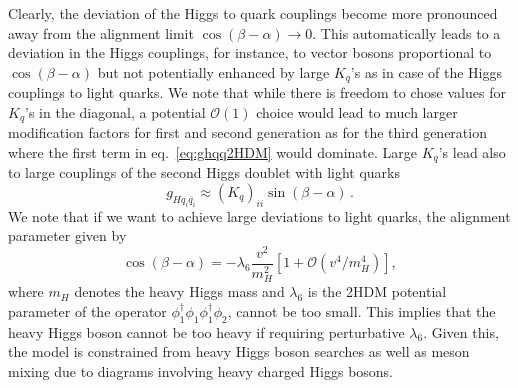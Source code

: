 Clearly, the deviation of the Higgs to quark couplings become more pronounced away from the alignment limit $\cos(\beta-\alpha)\to 0$. This automatically leads to a deviation in the Higgs couplings, for instance, to vector bosons proportional to $\cos(\beta-\alpha) $ but not potentially enhanced by large $K_{q}$'s as in case of the Higgs couplings to light quarks. We note that while there is freedom to chose values for $K_q$'s in the diagonal, a potential $\mathcal{O}(1)$ choice would lead to much larger modification factors for first and second generation as for the third generation where the first term in eq.~\eqref{eq:ghqq2HDM} would dominate.
Large $K_q$'s lead also to large couplings of the second Higgs doublet with light quarks 
\begin{equation}
	g_{H q_i \bar{q_i}} \approx (K_{q})_{ii}\sin{(\beta-\alpha)}  \,.  
	\label{Hqq}
\end{equation}
We note that if we want to achieve large deviations to light quarks, the alignment parameter given by
\begin{equation}
	\cos{(\beta-\alpha)}=-\lambda_6 \frac{v^2}{m_H^2}\left[1+\mathcal{O}(v^4/m_H^4) \right],
	\label{lambda6}
\end{equation}
where $m_H$ denotes the heavy Higgs mass and $\lambda_6$ is the 2HDM potential parameter of the operator $\phi_1^{\dagger}\phi_1 \phi_1^{\dagger}\phi_2$, cannot be too small. This implies that the heavy Higgs boson cannot be too heavy if requiring perturbative $\lambda_6$. Given this, the model is constrained from heavy Higgs boson searches as well as meson mixing due to diagrams involving heavy charged Higgs bosons.